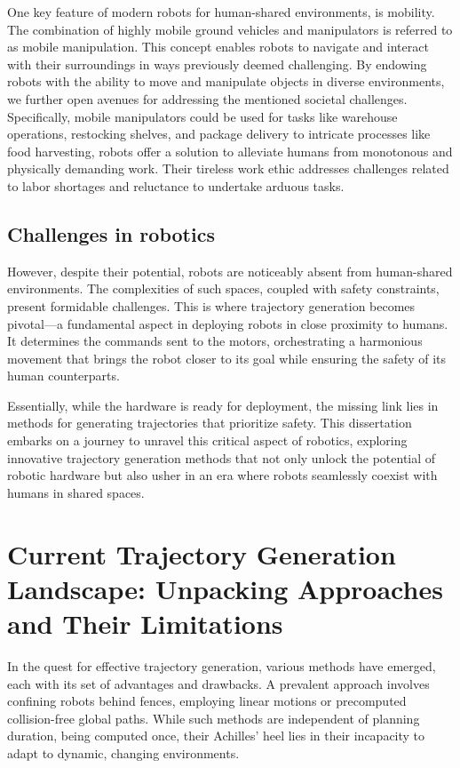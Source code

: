 One key feature of modern robots for human-shared environments, is mobility. The
combination of highly mobile ground vehicles and manipulators is referred to as
mobile manipulation. This concept enables robots to navigate and interact with
their surroundings in ways previously deemed challenging. By endowing robots
with the ability to move and manipulate objects in diverse environments, we
further open avenues for addressing the mentioned societal challenges.
Specifically, mobile manipulators could be used for tasks like warehouse
operations, restocking shelves, and package delivery to intricate processes like
food harvesting, robots offer a solution to alleviate humans from monotonous and
physically demanding work. Their tireless work ethic addresses challenges
related to labor shortages and reluctance to undertake arduous tasks.

\subsection{Challenges in robotics}

However, despite their potential, robots are noticeably absent from human-shared
environments. The complexities of such spaces, coupled with safety constraints,
present formidable challenges. This is where trajectory generation becomes
pivotal—a fundamental aspect in deploying robots in close proximity to humans.
It determines the commands sent to the motors, orchestrating a harmonious
movement that brings the robot closer to its goal while ensuring the safety of
its human counterparts.

Essentially, while the hardware is ready for deployment, the missing link lies
in methods for generating trajectories that prioritize safety. This dissertation
embarks on a journey to unravel this critical aspect of robotics, exploring
innovative trajectory generation methods that not only unlock the potential of
robotic hardware but also usher in an era where robots seamlessly coexist with
humans in shared spaces.

\section{Current Trajectory Generation Landscape: Unpacking Approaches and Their
Limitations}

In the quest for effective trajectory generation, various methods have emerged,
each with its set of advantages and drawbacks. A prevalent approach involves
confining robots behind fences, employing linear motions or precomputed
collision-free global paths. While such methods are independent of planning
duration, being computed once, their Achilles' heel lies in their incapacity to
adapt to dynamic, changing environments.

